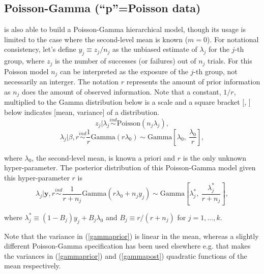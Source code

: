 \documentclass[article]{jss}
\begin{document}
\subsection[Poisson-Gamma]{Poisson-Gamma (``p''=Poisson data)}\label{poissonsubsec}
 is also able to build a Poisson-Gamma hierarchical model, though its usage is limited to the case where the second-level mean is known ($m=0$). For notational consistency, let's define $y_{j}\equiv z_{j} / n_{j}$ as the unbiased estimate of $\lambda_{j}$ for the $j$-th group, where  $z_{j}$ is the number of successes (or failures) out of $n_{j}$ trials. For this Poisson model $n_{j}$ can be interpreted as the exposure of the $j$-th group,  not necessarily an interger. The notation $r$ represents the amount of prior information as $n_{j}$ does the amount of observed information. Note that a constant, $1/r$, multiplied to the Gamma distribution below is a scale and a square bracket [, ] below indicates [mean, variance] of a distribution. 
\begin{equation}
z_{j}\vert \lambda_{j} \stackrel{ind}{\sim}\textrm{Poisson}(n_{j}\lambda_{j}),
\end{equation}
\begin{equation}\label{gammaprior}
\lambda_{j}\vert \beta, r\stackrel{ind}{\sim}\frac{1}{r}\textrm{Gamma}(r\lambda_{0})\sim \textrm{Gamma} \left[\lambda_{0}, ~\frac{\lambda_{0}}{r} \right],
\end{equation}

where $\lambda_{0}$, the second-level mean, is known a priori and $r$ is the only unknown hyper-parameter. The posterior distribution of this Poisson-Gamma model given this hyper-parameter $r$ is
\begin{equation} \label{gammapost}
\lambda_{j}\vert \textbf{y}, r \stackrel{ind}{\sim}\frac{1}{r + n_{j}}\textrm{Gamma}(r\lambda_{0} + n_{j}y_{j})\sim\textrm{Gamma} \left[\lambda^{\ast}_{j},~\frac{\lambda^{\ast}_{j}}{r+n_{j}} \right],
\end{equation}

where $\lambda^{\ast}_{j} \equiv (1-B_{j})y_{j} + B_{j}\lambda_{0}$ and   $B_{j}\equiv r / (r+n_{j})$ for $j=1, \ldots, k$. 


Note that the variance in (\ref{gammaprior}) is linear in the mean, whereas a slightly different Poisson-Gamma specification \citep{1997} has been used elsewhere e.g. that makes the variances in (\ref{gammaprior}) and (\ref{gammapost}) quadratic functions of the mean respectively.
\end{document}
